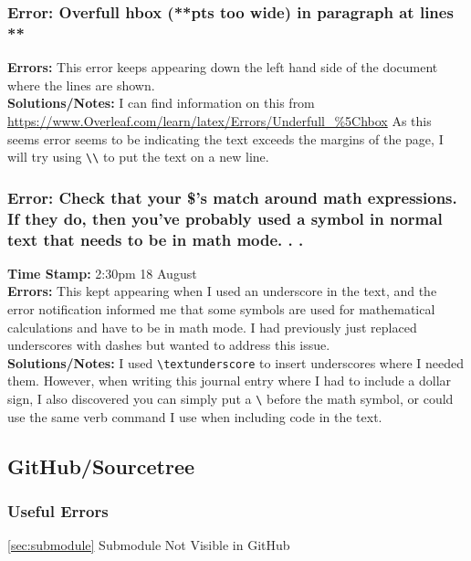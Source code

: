 \documentclass{article}
\begin{document}
\begin{FlushLeft}
\subsubsection{Error: Overfull hbox (**pts too wide) in paragraph at lines **}
\textbf{Errors:} This error keeps appearing down the left hand side of the document where the lines are shown.\\
\textbf{Solutions/Notes:} I can find information on this from \url{https://www.Overleaf.com/learn/latex/Errors/Underfull_%5Chbox}
As this seems error seems to be indicating the text exceeds the margins of the page, I will try using \verb|\\| to put the text on a new line. 

\subsubsection{Error: Check that your \$'s match around math expressions. If they do, then you've probably used a symbol in normal text that needs to be in math mode. . .}
\textbf{Time Stamp:} 2:30pm 18 August\\
\textbf{Errors:} This kept appearing when I used an underscore in the text, and the error notification informed me that some symbols are used for mathematical calculations and have to be in math mode. I had previously just replaced underscores with dashes but wanted to address this issue.\\
\textbf{Solutions/Notes:} I used \verb|\textunderscore| to insert underscores where I needed them. However, when writing this journal entry where I had to include a dollar sign, I also discovered you can simply put a \verb|\| before the math symbol, or could use the same verb command I use when including code in the text.

\subsection{GitHub/Sourcetree}

\subsubsection{Useful Errors}
\autoref{sec:submodule} Submodule Not Visible in GitHub


\end{FlushLeft}
\end{document}
